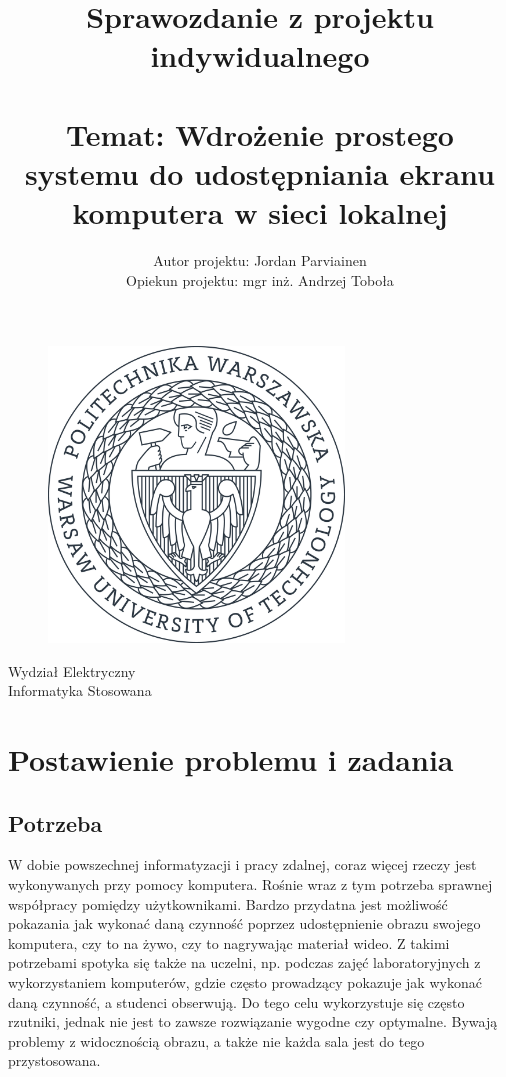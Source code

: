 \documentclass[a4paper,11pt]{article}
\title{%
    \huge{Sprawozdanie z projektu indywidualnego \\
    \ \\
    Temat: Wdrożenie prostego systemu do udostępniania ekranu komputera w sieci lokalnej}}
\author{\large{Autor projektu: Jordan Parviainen} \\ Opiekun projektu: mgr inż. Andrzej Toboła}
\begin{document}
    \maketitle
    \thispagestyle{empty}
    \begin{figure}[H]
        \centering
        \includegraphics[width=0.7\textwidth]{PW-uroczysty-grafitowe.png}
    \end{figure}
    \begin{center}\huge{Wydział Elektryczny} \\
    \huge{Informatyka Stosowana} 
    \end{center}
    \newpage
    \thispagestyle{empty}
    \tableofcontents
    \newpage
    \section{Postawienie problemu i zadania}
        \subsection{Potrzeba}
        W dobie powszechnej informatyzacji i pracy zdalnej, coraz więcej rzeczy jest wykonywanych przy pomocy komputera. Rośnie wraz z tym potrzeba sprawnej współpracy pomiędzy użytkownikami.  
        Bardzo przydatna jest możliwość pokazania jak wykonać daną czynność poprzez udostępnienie obrazu swojego komputera, czy to na żywo, czy to nagrywając materiał wideo. 
        Z takimi potrzebami spotyka się także na uczelni, np. podczas zajęć laboratoryjnych z wykorzystaniem komputerów, gdzie często prowadzący pokazuje jak wykonać daną czynność, a studenci obserwują.
        Do tego celu wykorzystuje się często rzutniki, jednak nie jest to zawsze rozwiązanie wygodne czy optymalne. Bywają problemy z widocznością obrazu, a także nie każda sala jest do tego przystosowana.  
\end{document}
